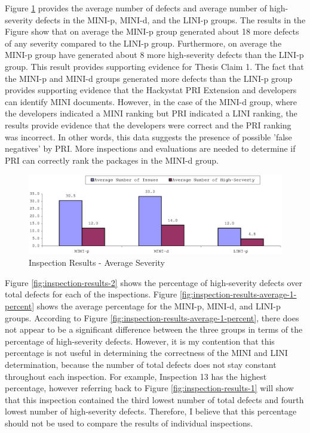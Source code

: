 Figure \ref{fig:inspection-results-average-1} provides the average number
of defects and average number of high-severity defects in the MINI-p,
MINI-d, and the LINI-p groups. The results in the Figure show that on
average the MINI-p group generated about 18 more defects of any severity
compared to the LINI-p group. Furthermore, on average the MINI-p group have
generated about 8 more high-severity defects than the LINI-p group. This
result provides supporting evidence for Thesis Claim 1. The fact that the
MINI-p and MINI-d groups generated more defects than the LINI-p group
provides supporting evidence that the Hackystat PRI Extension and
developers can identify MINI documents. However, in the case of the MINI-d
group, where the developers indicated a MINI ranking but PRI indicated a
LINI ranking, the results provide evidence that the developers were correct
and the PRI ranking was incorrect. In other words, this data suggests the
presence of possible 'false negatives' by PRI. More inspections and
evaluations are needed to determine if PRI can correctly rank the packages
in the MINI-d group.

\begin{figure}[!h]
  \centering
  \includegraphics[width=1.0\textwidth]{figs/Results/inspection-results-average-1.eps}
  \caption{Inspection Results - Average Severity}
  \label{fig:inspection-results-average-1}
\end{figure}

Figure \ref{fig:inspection-results-2} shows the percentage of high-severity
defects over total defects for each of the inspections. Figure
\ref{fig:inspection-results-average-1-percent} shows the average percentage
for the MINI-p, MINI-d, and LINI-p groups. According to Figure
\ref{fig:inspection-results-average-1-percent}, there does not appear to be
a significant difference between the three groups in terms of the
percentage of high-severity defects. However, it is my contention that this
percentage is not useful in determining the correctness of the MINI and
LINI determination, because the number of total defects does not stay
constant throughout each inspection. For example, Inspection 13 has the
highest percentage, however referring back to Figure
\ref{fig:inspection-results-1} will show that this inspection contained the
third lowest number of total defects and fourth lowest number of
high-severity defects. Therefore, I believe that this percentage should not
be used to compare the results of individual inspections.

